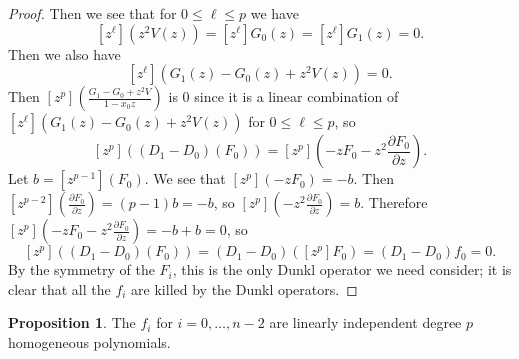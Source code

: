 \documentclass{amsart}
\numberwithin{equation}{section}
\theoremstyle{definition}
\newtheorem{proposition}[theorem]{Proposition}
\begin{document}
\begin{proof}
Then we see that for $0 \le \ell \le p$ we have
\[
[z^\ell](z^2V(z))=[z^\ell]G_0(z)=[z^\ell]G_1(z)=0.
\]
Then we also have
\[
[z^\ell](G_1(z)-G_0(z)+z^2V(z))=0.
\]
Then $[z^p]\left(\frac{G_1-G_0+z^2V}{1-x_0z}\right)$ is $0$ since it is a linear combination of $[z^\ell](G_1(z)-G_0(z)+z^2V(z))$ for $0 \le \ell \le p$, so 
\[
[z^p]\left((D_1-D_0)(F_0)\right)=[z^p]\left(-zF_0-z^2\frac{\partial F_0}{\partial z}\right).
\]
Let $b=[z^{p-1}](F_0)$. We see that $[z^p](-zF_0)=-b$. Then $[z^{p-2}]\left(\frac{\partial F_0}{\partial z}\right)=(p-1)b=-b$, so $[z^p]\left(-z^2\frac{\partial F_0}{\partial z}\right)=b$. Therefore $[z^p]\left(-zF_0-z^2\frac{\partial F_0}{\partial z}\right)=-b+b=0$, so 
\[
[z^p]((D_1-D_0)(F_0))=(D_1-D_0)([z^p]F_0)=(D_1-D_0)f_0=0.
\]
By the symmetry of the $F_i$, this is the only Dunkl operator we need consider; it is clear that all the $f_i$ are killed by the Dunkl operators.
\end{proof}

\begin{proposition}\label{prop:linind} The $f_i$ for $i=0,\dots,n-2$ are linearly independent degree $p$ homogeneous polynomials.
\end{proposition} 
\end{document}
